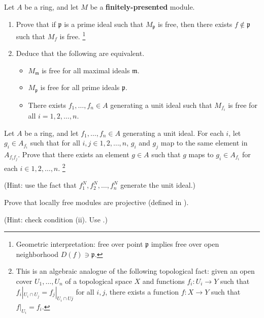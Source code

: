 \begin{problem}
Let $A$ be a ring, and let $M$ be a \textbf{finitely-presented} module.
\begin{enumerate}[label=(\alph*)]
\item Prove that if $\mathfrak p$ is a prime ideal such that $M_{\mathfrak p}$ is free, then there exists $f\notin \mathfrak p$ such that $M_f$ is free.%
\footnote{Geometric interpretation: free over point $\mathfrak p$ implies free over open neighborhood $D(f)\ni\mathfrak p$.}
\item Deduce that the following are equivalent.
\begin{itemize}
\item $M_{\mathfrak m}$ is free for all maximal ideals $\mathfrak m$.
\item $M_{\mathfrak p}$ is free for all prime ideals $\mathfrak p$.
\item There exists $f_1,\dots,f_n\in A$ generating a unit ideal such that $M_{f_i}$ is free for all $i=1,2,\dots,n$.
\end{itemize}
\end{enumerate}
\end{problem}
\begin{problem}[Gluing]
\label{prob:gluing}
Let $A$ be a ring, and let $f_1,\dots,f_n\in A$ generating a unit ideal. For each $i$, let $g_i\in A_{f_i}$ such that for all $i,j\in{1,2,\dots,n}$, $g_i$ and $g_j$ map to the same element in $A_{f_if_j}$. Prove that there exists an element $g\in A$ such that $g$ maps to $g_i\in A_{f_i}$ for each $i\in{1,2,\dots,n}$.%
\footnote{This is an algebraic analogue of the following topological fact: given an open cover $U_1,\dots,U_n$ of a topological space $X$ and functions $f_i : U_i\to Y$ such that $f_i|_{U_i\cap U_j} = f_j|_{U_i\cap Uj}$ for all $i,j$, there exists a function $f : X\to Y$ such that $f|_{U_i} = f_i$.}

(Hint: use the fact that $f_1^N, f_2^N,\dots,f_n^N$ generate the unit ideal.) 
\end{problem}
\begin{problem}
Prove that locally free modules are projective
(defined in ).

(Hint: check condition (ii). Use .)
\end{problem}